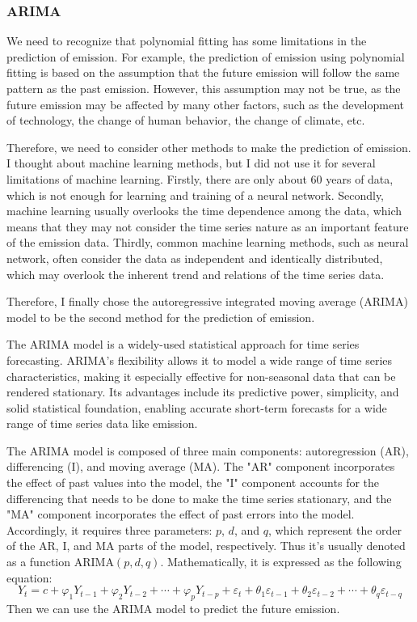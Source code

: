 \documentclass[12pt,a4paper]{article}
\begin{document}
    \subsubsection{ARIMA}
    We need to recognize that polynomial fitting has some limitations in the prediction of  emission. For example, the prediction of  emission using polynomial fitting is based on the assumption that the future  emission will follow the same pattern as the past  emission. However, this assumption may not be true, as the future  emission may be affected by many other factors, such as the development of technology, the change of human behavior, the change of climate, etc. 

    Therefore, we need to consider other methods to make the prediction of  emission. I thought about machine learning methods, but I did not use it for several limitations of machine learning. Firstly, there are only about 60 years of data, which is not enough for learning and training of a neural network. Secondly, machine learning usually overlooks the time dependence among the data, which means that they may not consider the time series nature as an important feature of the  emission data. Thirdly, common machine learning methods, such as neural network, often consider the data as independent and identically distributed, which may overlook the inherent trend and relations of the time series data. 
    
    Therefore, I finally chose the autoregressive integrated moving average (ARIMA) model to be the second method for the prediction of  emission. 
    
    The ARIMA model is a widely-used statistical approach for time series forecasting. ARIMA's flexibility allows it to model a wide range of time series characteristics, making it especially effective for non-seasonal data that can be rendered stationary. Its advantages include its predictive power, simplicity, and solid statistical foundation, enabling accurate short-term forecasts for a wide range of time series data like  emission. 
    
    The ARIMA model is composed of three main components: autoregression (AR), differencing (I), and moving average (MA). The "AR" component incorporates the effect of past values into the model, the "I" component accounts for the differencing that needs to be done to make the time series stationary, and the "MA" component incorporates the effect of past errors into the model. Accordingly, it requires three parameters: $p$, $d$, and $q$, which represent the order of the AR, I, and MA parts of the model, respectively. Thus it's usually denoted as a function ARIMA$(p, d, q)$. Mathematically, it is expressed as the following equation:
    \begin{equation}\label{6}
        Y_t=c+\varphi_1Y_{t-1}+\varphi_2Y_{t-2}+\cdots+\varphi_pY_{t-p}+\varepsilon_t+\theta_1\varepsilon_{t-1}+\theta_2\varepsilon_{t-2}+\cdots+\theta_q\varepsilon_{t-q}
    \end{equation}
    Then we can use the ARIMA model to predict the future  emission. 
    
\end{document}
